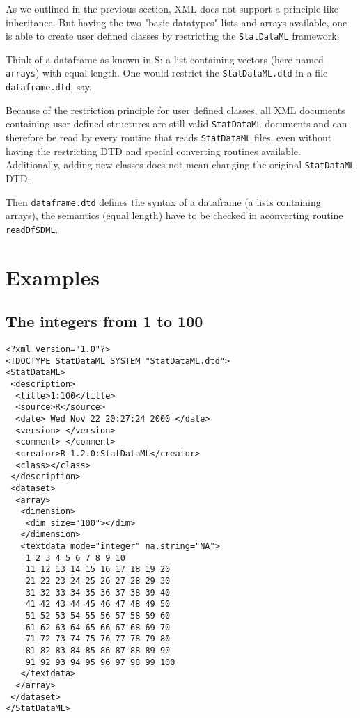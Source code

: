 \documentclass[a4paper]{article}
\begin{document}
As we outlined in the previous section, XML does not support a
principle like inheritance. But having the two "basic datatypes" lists
and arrays available, one is able to create user defined classes by
restricting the \texttt{StatDataML} framework.

Think of a dataframe as known in S: a list containing vectors (here
named \texttt{arrays}) with equal length. One would restrict the
\texttt{StatDataML.dtd} in a file \texttt{dataframe.dtd}, say.

Because of the restriction principle for user defined classes, all XML
documents containing user defined structures are still valid
\texttt{StatDataML} documents and can therefore be read by every
routine that reads \texttt{StatDataML} files, even without having the
restricting DTD and special converting routines available.
Additionally, adding new classes does not mean changing the original
\texttt{StatDataML} DTD.

Then \texttt{dataframe.dtd} defines the syntax of a dataframe (a lists
containing arrays), the semantics (equal length) have to be checked in
aconverting routine \texttt{readDfSDML}.

\section{Examples}

\subsection{The integers from 1 to 100}

\begin{verbatim}
<?xml version="1.0"?>
<!DOCTYPE StatDataML SYSTEM "StatDataML.dtd">
<StatDataML>
 <description>
  <title>1:100</title>
  <source>R</source>
  <date> Wed Nov 22 20:27:24 2000 </date>
  <version> </version>
  <comment> </comment>
  <creator>R-1.2.0:StatDataML</creator>
  <class></class>
 </description>
 <dataset>
  <array>
   <dimension>
    <dim size="100"></dim>
   </dimension>
   <textdata mode="integer" na.string="NA">
    1 2 3 4 5 6 7 8 9 10
    11 12 13 14 15 16 17 18 19 20
    21 22 23 24 25 26 27 28 29 30
    31 32 33 34 35 36 37 38 39 40
    41 42 43 44 45 46 47 48 49 50
    51 52 53 54 55 56 57 58 59 60
    61 62 63 64 65 66 67 68 69 70
    71 72 73 74 75 76 77 78 79 80
    81 82 83 84 85 86 87 88 89 90
    91 92 93 94 95 96 97 98 99 100
   </textdata>
  </array>
 </dataset>
</StatDataML>
\end{verbatim}
\end{document}
